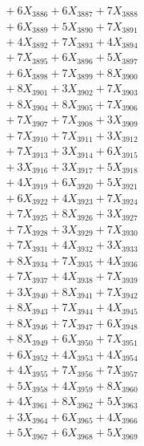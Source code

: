 \documentclass[a4paper,10pt]{article}
\begin{document}
{\begin{align}
&\;  + 6 X_{3886} + 6 X_{3887} + 7 X_{3888} \\[0.3ex]
&\;  + 6 X_{3889} + 5 X_{3890} + 7 X_{3891} \\[0.3ex]
&\;  + 4 X_{3892} + 7 X_{3893} + 4 X_{3894} \\[0.3ex]
&\;  + 7 X_{3895} + 6 X_{3896} + 5 X_{3897} \\[0.3ex]
&\;  + 6 X_{3898} + 7 X_{3899} + 8 X_{3900} \\[0.3ex]
&\;  + 8 X_{3901} + 3 X_{3902} + 7 X_{3903} \\[0.3ex]
&\;  + 8 X_{3904} + 8 X_{3905} + 7 X_{3906} \\[0.3ex]
&\;  + 7 X_{3907} + 7 X_{3908} + 3 X_{3909} \\[0.5ex]\allowbreak
&\;  + 7 X_{3910} + 7 X_{3911} + 3 X_{3912} \\[0.3ex]
&\;  + 7 X_{3913} + 3 X_{3914} + 6 X_{3915} \\[0.3ex]
&\;  + 3 X_{3916} + 3 X_{3917} + 5 X_{3918} \\[0.3ex]
&\;  + 4 X_{3919} + 6 X_{3920} + 5 X_{3921} \\[0.3ex]
&\;  + 6 X_{3922} + 4 X_{3923} + 7 X_{3924} \\[0.3ex]
&\;  + 7 X_{3925} + 8 X_{3926} + 3 X_{3927} \\[0.3ex]
&\;  + 7 X_{3928} + 3 X_{3929} + 7 X_{3930} \\[0.3ex]
&\;  + 7 X_{3931} + 4 X_{3932} + 3 X_{3933} \\[0.3ex]
&\;  + 8 X_{3934} + 7 X_{3935} + 4 X_{3936} \\[0.3ex]
&\;  + 7 X_{3937} + 4 X_{3938} + 7 X_{3939} \\[0.5ex]\allowbreak
&\;  + 3 X_{3940} + 8 X_{3941} + 7 X_{3942} \\[0.3ex]
&\;  + 8 X_{3943} + 7 X_{3944} + 4 X_{3945} \\[0.3ex]
&\;  + 8 X_{3946} + 7 X_{3947} + 6 X_{3948} \\[0.3ex]
&\;  + 8 X_{3949} + 6 X_{3950} + 7 X_{3951} \\[0.3ex]
&\;  + 6 X_{3952} + 4 X_{3953} + 4 X_{3954} \\[0.3ex]
&\;  + 4 X_{3955} + 7 X_{3956} + 7 X_{3957} \\[0.3ex]
&\;  + 5 X_{3958} + 4 X_{3959} + 8 X_{3960} \\[0.3ex]
&\;  + 4 X_{3961} + 8 X_{3962} + 5 X_{3963} \\[0.3ex]
&\;  + 3 X_{3964} + 6 X_{3965} + 4 X_{3966} \\[0.3ex]
&\;  + 5 X_{3967} + 6 X_{3968} + 5 X_{3969} \\[0.5ex]\allowbreak

\end{align}}
\end{document}
